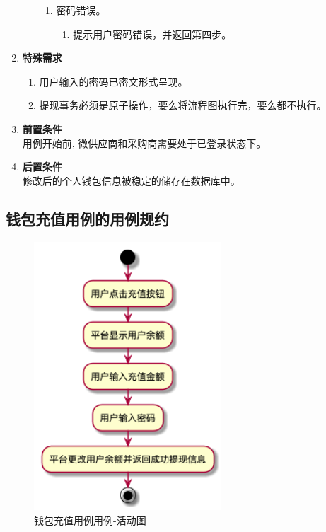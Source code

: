 \begin{enumerate}
\begin{enumerate}
\begin{enumerate}
            \item 密码错误。
            \begin{enumerate}
                \item 提示用户密码错误，并返回第四步。
            \end{enumerate}
            \end{enumerate}
    \end{enumerate}
    \item \textbf{特殊需求}
    \begin{enumerate}
        \item 用户输入的密码已密文形式呈现。
        \item 提现事务必须是原子操作，要么将流程图执行完，要么都不执行。
    \end{enumerate}
    \item \textbf{前置条件} \\ 用例开始前, 微供应商和采购商需要处于已登录状态下。
    \item \textbf{后置条件} \\ 修改后的个人钱包信息被稳定的储存在数据库中。 
\end{enumerate}


\subsection{钱包充值用例的用例规约}
\begin{figure}[htp]
    \centering
    \includegraphics[width=7cm]{report/figure/usecase_v2/topup.png}
    \caption{钱包充值用例用例-活动图}
    \label{fig:topup}
\end{figure}


